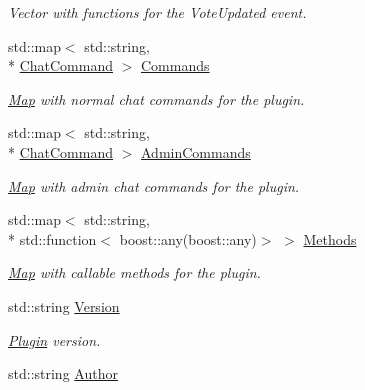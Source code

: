 \begin{DoxyCompactItemize}
\begin{DoxyCompactList}\small\item\em Vector with functions for the Vote\-Updated event. \end{DoxyCompactList}\item 
\hypertarget{classPlugin_aee4f6d78f9eebd617a344ab341bf3459}{std\-::map$<$ std\-::string, \\*
\hyperlink{structChatCommand}{Chat\-Command} $>$ \hyperlink{classPlugin_aee4f6d78f9eebd617a344ab341bf3459}{Commands}}\label{classPlugin_aee4f6d78f9eebd617a344ab341bf3459}

\begin{DoxyCompactList}\small\item\em \hyperlink{structMap}{Map} with normal chat commands for the plugin. \end{DoxyCompactList}\item 
\hypertarget{classPlugin_a95464d6918bc71c096dff5504f4b6051}{std\-::map$<$ std\-::string, \\*
\hyperlink{structChatCommand}{Chat\-Command} $>$ \hyperlink{classPlugin_a95464d6918bc71c096dff5504f4b6051}{Admin\-Commands}}\label{classPlugin_a95464d6918bc71c096dff5504f4b6051}

\begin{DoxyCompactList}\small\item\em \hyperlink{structMap}{Map} with admin chat commands for the plugin. \end{DoxyCompactList}\item 
\hypertarget{classPlugin_a4a8030e2fa113265d123aa6178c64318}{std\-::map$<$ std\-::string, \\*
std\-::function$<$ boost\-::any(boost\-::any)$>$ $>$ \hyperlink{classPlugin_a4a8030e2fa113265d123aa6178c64318}{Methods}}\label{classPlugin_a4a8030e2fa113265d123aa6178c64318}

\begin{DoxyCompactList}\small\item\em \hyperlink{structMap}{Map} with callable methods for the plugin. \end{DoxyCompactList}\item 
\hypertarget{classPlugin_a8e332303a494988d2444589ac21c3414}{std\-::string \hyperlink{classPlugin_a8e332303a494988d2444589ac21c3414}{Version}}\label{classPlugin_a8e332303a494988d2444589ac21c3414}

\begin{DoxyCompactList}\small\item\em \hyperlink{classPlugin}{Plugin} version. \end{DoxyCompactList}\item 
\hypertarget{classPlugin_a2b51c785a131a581164f2c82e83cb660}{std\-::string \hyperlink{classPlugin_a2b51c785a131a581164f2c82e83cb660}{Author}}\label{classPlugin_a2b51c785a131a581164f2c82e83cb660}


\end{DoxyCompactItemize}
